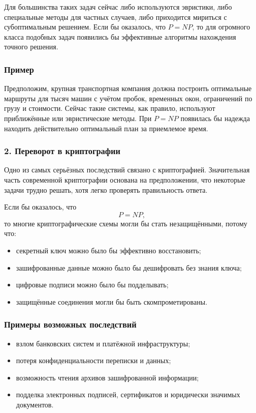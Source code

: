 \documentclass[12pt,a4paper]{article}
\theoremstyle{definition}
\theoremstyle{plain}
\begin{document}
Для большинства таких задач сейчас либо используются эвристики, либо специальные методы для частных случаев, либо приходится мириться с субоптимальным решением. Если бы оказалось, что $P=NP$, то для огромного класса подобных задач появились бы эффективные алгоритмы нахождения точного решения.

\subsubsection*{Пример}
Предположим, крупная транспортная компания должна построить оптимальные маршруты для тысяч машин с учётом пробок, временных окон, ограничений по грузу и стоимости. Сейчас такие системы, как правило, используют приближённые или эвристические методы. При $P=NP$ появилась бы надежда находить действительно оптимальный план за приемлемое время.

\subsubsection{2. Переворот в криптографии}
Одно из самых серьёзных последствий связано с криптографией. Значительная часть современной криптографии основана на предположении, что некоторые задачи трудно решать, хотя легко проверять правильность ответа.

Если бы оказалось, что
\[
P=NP,
\]
то многие криптографические схемы могли бы стать незащищёнными, потому что:
\begin{itemize}
\item секретный ключ можно было бы эффективно восстановить;
\item зашифрованные данные можно было бы дешифровать без знания ключа;
\item цифровые подписи можно было бы подделывать;
\item защищённые соединения могли бы быть скомпрометированы.
\end{itemize}

\subsubsection*{Примеры возможных последствий}
\begin{itemize}
\item взлом банковских систем и платёжной инфраструктуры;
\item потеря конфиденциальности переписки и данных;
\item возможность чтения архивов зашифрованной информации;
\item подделка электронных подписей, сертификатов и юридически значимых документов.
\end{itemize}
\end{document}
